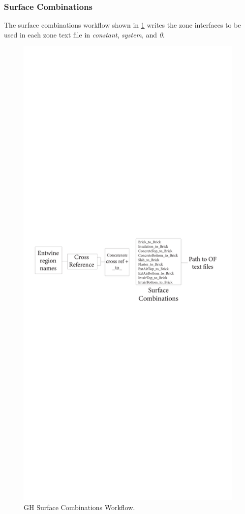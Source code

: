 \subsubsection{Surface Combinations}
The surface combinations workflow shown in \ref{surfgh} writes the zone interfaces to be used in each zone text file in \textit{constant}, \textit{system}, and \textit{0}. 

\begin{figure}[tb]
\centering
\includegraphics[trim=0cm 39cm 0cm 29cm, clip, width=0.8\linewidth]{Figures/surfcombgh.pdf}
\hspace{0.7cm}
\caption{\gls{GH} Surface Combinations Workflow.}
\label{surfgh}
\end{figure}



